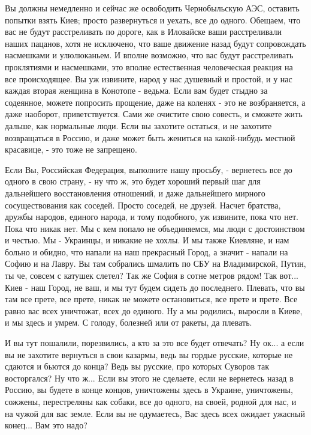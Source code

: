 Вы должны немедленно и сейчас же освободить Чернобыльскую АЭС, оставить попытки взять Киев; просто
развернуться и уехать, все до одного. Обещаем, что вас не будут расстреливать
по дороге, как в Иловайске ваши расстреливали наших пацанов, хотя не исключено,
что ваше движение назад будут сопровождать насмешками и улюлюканьем. И вполне
возможно, что вас будут расстреливать проклятиями и насмешками, это вполне
естественная человеческая реакция на все происходящее. Вы уж извините, народ у
нас душевный и простой, и у нас каждая вторая женщина в Конотопе - ведьма. Если
вам будет стыдно за содеянное, можете попросить прощение, даже на коленях - это
не возбраняется, а даже наоборот, приветствуется. Сами же очистите свою
совесть, и сможете жить дальше, как нормальные люди. Если вы захотите остаться,
и не захотите возвращаться в Россию, и даже может быть жениться на какой-нибудь
местной красавице, - это тоже не запрещено.

Если Вы, Российская Федерация, выполните нашу просьбу, - вернетесь все до
одного в свою страну, - ну что ж, это будет хороший первый шаг для дальнейшего
восстановления отношений, и даже дальнейшего мирного сосуществования как
соседей. Просто соседей, не друзей. Насчет братства, дружбы народов, единого
народа, и тому подобного, уж извините, пока что нет.  Пока что никак нет. Мы с
кем попало не объединяемся, мы люди с достоинством и честью. Мы - Украинцы, и
никакие не хохлы. И мы также Киевляне, и нам больно и обидно, что напали на наш
прекрасный Город, а значит - напали на Софию и на Лавру. Вы там собрались
шмалить по СБУ на Владимирской, Путин, ты че, совсем с катушек слетел? Так же
София в сотне метров рядом! Так вот... Киев - наш Город, не ваш, и мы тут будем
сидеть до последнего.  Плевать, что вы там все прете, все прете, никак не
можете остановиться, все прете и прете. Все равно вас всех уничтожат, всех до
единого. Ну а мы родились, выросли в Киеве, и мы здесь и умрем. С голоду,
болезней или от ракеты, да плевать.

И вы тут пошалили, порезвились, а кто за это все будет отвечать? Ну ок... а
если вы не захотите вернуться в свои казармы, ведь вы гордые русские, которые не сдаются и бьются до
конца? Ведь вы русские, про которых Суворов так восторгался? Ну что ж...  Если
вы этого не сделаете, если не вернетесь назад в Россию, вы будете в конце
концов, уничтожены здесь в Украине, уничтожены, сожжены, перестреляны как
собаки, все до одного, на своей, родной для нас, и на чужой для вас земле.
Если вы не одумаетесь, Вас здесь всех ожидает ужасный конец... Вам это надо?

